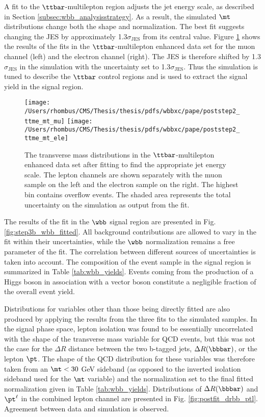 A fit to the $\ttbar$-multilepton region adjusts
 the jet energy scale, as described in Section \ref{subsec:wbb_analysisstrategy}.
As a result, the simulated $\mt$ distributions
 change both the shape and normalization.
The best fit suggests changing the
 JES by approximately 1.3$\sigma_{\mathrm{JES}}$ from its central value.
Figure \ref{fig:step2_ttme_fitted}
 shows the results of the fits in the $\ttbar$-multilepton
 enhanced data set for
 the muon channel (left)
 and the electron channel (right).
The JES is therefore shifted by 1.3$\sigma_{\mathrm{JES}}$ in
 the simulation with the uncertainty
 set to 1.3$\sigma_{\mathrm{JES}}$.
Thus the simulation is tuned to describe the $\ttbar$
 control regions and is
 used to extract the signal yield in the signal region.

\begin{figure}[htbp]
\center
\texttt{[image: /Users/rhombus/CMS/Thesis/thesis/pdfs/wbbxc/pape/poststep2\_ttme\_mt\_mu]}
\texttt{[image: /Users/rhombus/CMS/Thesis/thesis/pdfs/wbbxc/pape/poststep2\_ttme\_mt\_ele]}
\caption{
  The transverse mass distributions in the $\ttbar$-multilepton enhanced data set after
   fitting to find the appropriate jet energy scale.
  The lepton channels are shown separately with the muon sample on the left and the electron sample on the right.
  The highest bin contains overflow events.
 The shaded area represents the total uncertainty on the simulation as output from the fit.
 }
\label{fig:step2_ttme_fitted}
\end{figure}

The results of the fit in the $\wbb$ signal region
 are presented in Fig. \ref{fig:step3b_wbb_fitted}.
All background contributions are allowed to vary
 in the fit within their uncertainties,
 while the $\wbb$ normalization remains a free parameter of the fit.
The correlation between different sources of uncertainties
 is taken into account.
The composition of the event sample in
 the signal region is summarized in Table \ref{tab:wbb_yields}.
Events coming from the production of a Higgs boson in association
 with a vector boson constitute a negligible fraction of the
 overall event yield.

Distributions for variables other than those being directly fitted are
 also produced by applying the results from the three fits to
 the simulated samples.
In the signal phase space, lepton isolation was found to be essentially uncorrelated
 with the shape of the transverse mass variable for QCD events,
 but this was not the case for the $\Delta R$ distance between the
 two b-tagged jets, $\Delta R(\mathrm{\bbbar})$, or the lepton $\pt$.
The shape of the QCD distribution for these variables was therefore
 taken from an $\mt<30$ GeV sideband (as opposed to the inverted isolation
 sideband used for the $\mt$ variable) and the normalization
 set to the final fitted normalization given in Table \ref{tab:wbb_yields}.
Distributions of $\Delta R(\mathrm{\bbbar})$ and $\pt^\ell$ in the
 combined lepton channel are presented in Fig. \ref{fig:postfit_drbb_ptl}.
Agreement between data and simulation is observed.

